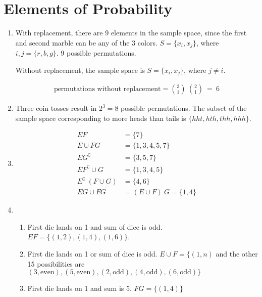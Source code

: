 \chapter{Elements of Probability}

\begin{enumerate}
	\item With replacement, there are 9 elements in the sample space, since the first and second marble can be any of the 3 colors. $ S = \{ x_i, x_j \} $, where $ i, j = \{ r, b, g \} $. 9 possible permutations.
	
	Without replacement, the sample space is $ S = \{ x_i, x_j \} $, where $ j \neq i $.
	
	\begin{align}
		\text{permutations without replacement} =  \binom{3}{1} \ \binom{2}{1} \ = \ 6
	\end{align}
	
	\item Three coin tosses result in $ 2^3  = 8$ possible permutations. The subset of the sample space corresponding to more heads than tails is $ \{ hht, hth, thh, hhh \} $.
	
	\item 	
		\begin{align}
			E F &= \{ 7 \} \\
			E \cup FG &= \{ 1, 3, 4, 5, 7 \} \\
			E G^\complement &= \{ 3, 5, 7 \} \\
			E F^\complement \cup G &= \{ 1, 3, 4, 5 \} \\
			E^\complement \  ( F \cup G ) &= \{ 4, 6 \} \\
			EG \cup FG &= (E \cup F) \ G = \{ 1, 4 \}
		\end{align}	
	
	
	\item \begin{enumerate}
		\item First die lands on 1 and sum of dice is odd. $ EF  = \{ (1,2), (1,4), (1,6) \}$.
		
		\item First die lands on 1 or sum of dice is odd. $ E \cup F = \{ (1, n) $ and the other 15 possibilities are $ (3, \text{even}), (5, \text{even}), (2, \text{odd}), (4, \text{odd}), (6, \text{odd}) \} $ \\
		
		\item First die lands on 1 and sum is 5. $ FG = \{ (1,4) \} $ \\
		

\end{enumerate}
\end{enumerate}

